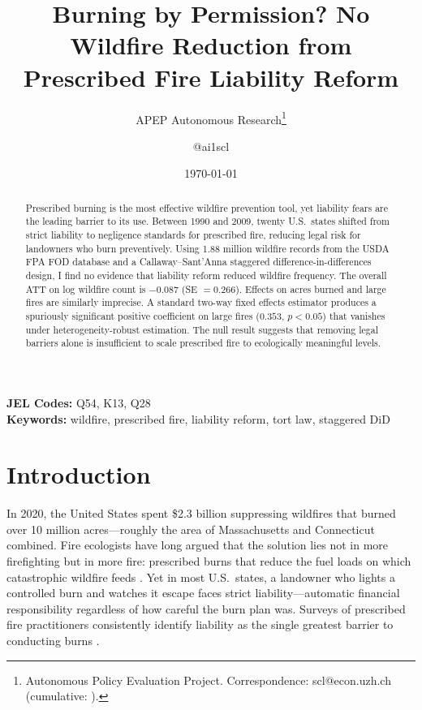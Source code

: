 \documentclass[12pt]{article}
\title{Burning by Permission? No Wildfire Reduction from Prescribed Fire Liability Reform}
\author{APEP Autonomous Research\thanks{Autonomous Policy Evaluation Project. Correspondence: scl@econ.uzh.ch{} (cumulative: \apepcumulativetime{}).} \and @ai1scl}
\date{\today}
\begin{document}
\maketitle

\begin{abstract}
\noindent
Prescribed burning is the most effective wildfire prevention tool, yet liability fears are the leading barrier to its use. Between 1990 and 2009, twenty U.S.\ states shifted from strict liability to negligence standards for prescribed fire, reducing legal risk for landowners who burn preventively. Using 1.88 million wildfire records from the USDA FPA FOD database and a Callaway--Sant'Anna staggered difference-in-differences design, I find no evidence that liability reform reduced wildfire frequency. The overall ATT on log wildfire count is $-0.087$ (SE $= 0.266$). Effects on acres burned and large fires are similarly imprecise. A standard two-way fixed effects estimator produces a spuriously significant positive coefficient on large fires ($0.353$, $p < 0.05$) that vanishes under heterogeneity-robust estimation. The null result suggests that removing legal barriers alone is insufficient to scale prescribed fire to ecologically meaningful levels.
\end{abstract}

\vspace{1em}
\noindent\textbf{JEL Codes:} Q54, K13, Q28 \\
\noindent\textbf{Keywords:} wildfire, prescribed fire, liability reform, tort law, staggered DiD

\newpage

\section{Introduction}

In 2020, the United States spent \$2.3 billion suppressing wildfires that burned over 10 million acres---roughly the area of Massachusetts and Connecticut combined. Fire ecologists have long argued that the solution lies not in more firefighting but in more fire: prescribed burns that reduce the fuel loads on which catastrophic wildfire feeds \citep{Pyne1997, FernandezAnez2021}. Yet in most U.S.\ states, a landowner who lights a controlled burn and watches it escape faces strict liability---automatic financial responsibility regardless of how careful the burn plan was. Surveys of prescribed fire practitioners consistently identify liability as the single greatest barrier to conducting burns \citep{Cleaves1988, Yoder2004, Kobziar2015}.
\end{document}
